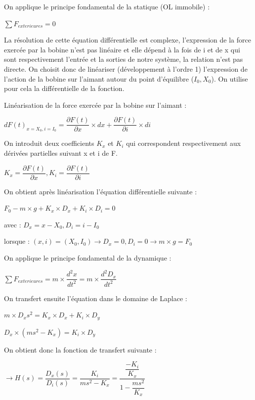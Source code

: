 \documentclass[11pt, french]{article} %
\begin{document}
\medskip
\noindent
On applique le principe fondamental de la statique (OL immobile) :

 \medskip
$ \sum F_{exterieures}  = 0 $
 \medskip

La résolution de cette équation différentielle est complexe, l'expression de la force exercée par la bobine n'est pas linéaire et elle dépend à la fois de i et de x qui sont respectivement l'entrée et la sorties de notre système, la relation n'est pas directe. On choisit donc de linéariser (développement à l'ordre 1) l'expression de l'action de la bobine sur l'aimant autour du point d'équilibre ($I_0, X_0 $). On utilise pour cela la différentielle de la fonction.

\medskip
\noindent
Linéarisation de la force exercée par la bobine sur l'aimant :

 \medskip
$ {dF(t)}_{x = X_0, i = I_0} = \dfrac{\partial F(t)}{\partial x} \times dx + \dfrac{\partial F(t)}{\partial i} \times di $
 \medskip

\noindent
On introduit deux coefficients $ K_x $ et $ K_i $ qui correspondent respectivement aux dérivées partielles suivant x et i de F.

 \medskip
$ K_x = \dfrac{\partial F(t)}{\partial x}, K_i = \dfrac{\partial F(t)}{\partial i} $
 \medskip

\noindent
On obtient après linéarisation l'équation différentielle suivante :

 \medskip
$ F_0 - m \times g + K_x \times D_x + K_i \times D_i = 0 $
 \medskip

avec : $ D_x = x - X_0, D_i = i - I_0 $

lorsque : $ (x, i) = (X_0, I_0) \rightarrow D_x = 0, D_i = 0 \rightarrow m \times g = F_0 $

\medskip
\noindent
On applique le principe fondamental de la dynamique :

 \medskip
$ \sum F_{exterieures}  = m \times \dfrac{d^2x}{dt^2} = m \times \dfrac{d^2D_x}{dt^2} $
 \medskip

\noindent
On transfert ensuite l'équation dans le domaine de Laplace :

 \medskip
$ m \times D_x{s^2} = K_x \times D_x + K_i \times D_y $

$ D_x \times (m{s^2} - K_x) = K_i \times D_y $
 \medskip

\noindent
On obtient donc la fonction de transfert suivante :

 \medskip
$ \rightarrow H(s) = \dfrac{D_x(s)}{D_i(s)} = \dfrac{K_i}{m{s^2}- K_x}  = \dfrac{\dfrac{-K_i}{K_x}}{1 - \dfrac{m{s^2}}{K_x}} $
 \medskip
\end{document}
